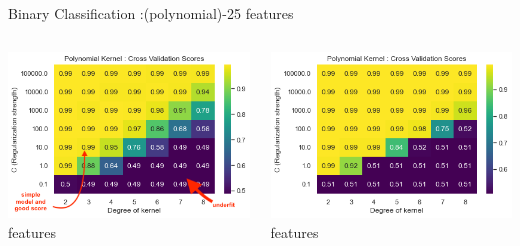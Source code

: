 \documentclass[12pt,t]{beamer}
\begin{document}
\begin{frame}[t]{Binary Classification :(polynomial)-25 features}
    \scriptsize

    \begin{columns}
        \begin{column}[T]{0.50\linewidth}
            \includegraphics[width=\linewidth]{images/p1a/2(binary clf)/classes1and4_libsvm_poly10f.png}
             features
        \end{column}
        \begin{column}[T]{0.50\linewidth}
            \includegraphics[width=\linewidth]{images/p1a/2(binary clf)/classes1and4_libsvm_poly25f.png}
             features
        \end{column}
    \end{columns}


\end{frame}
\end{document}
